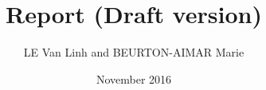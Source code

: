 \title{Report (Draft version)}
\author{LE Van Linh and BEURTON-AIMAR Marie}
\date{November 2016}
\maketitle